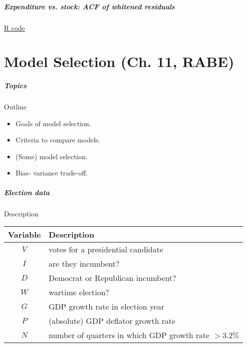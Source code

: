 \documentclass[handout]{beamer}
\begin{document}


   \begin{frame}
   \frametitle{Expenditure vs. stock: ACF of whitened residuals}
   \begin{center}
   \end{center}
   \href{http://stats191.stanford.edu/correlated_errors.html#consumer-expenditure}{R code}
   \end{frame}

   \part{Model Selection  (Ch. 11, RABE)}
   \frame{\partpage}


   \begin{frame} \frametitle{Topics}

   \begin{block}
   {Outline}
   \begin{itemize}


   \item Goals of model selection.

   \item Criteria to compare models.
   \item (Some) model selection.
   \item Bias- variance trade-off.

   \end{itemize}
   \end{block}
   \end{frame}


   \begin{frame} \frametitle{Election data}

   \begin{block}
   {Description}

   \begin{tabular}{c|l}
   Variable & Description \\ \hline
   $V$ & votes for a presidential candidate \\
   $I$ & are they incumbent? \\
   $D$ & Democrat or Republican incumbent? \\
   $W$ & wartime election? \\
   $G$ & GDP growth rate in election year \\
   $P$ & (absolute) GDP deflator growth rate \\
   $N$ & number of quarters in which GDP growth rate $> 3.2\%$
   \end{tabular}
   \end{block}
   \end{frame}
\end{document}
